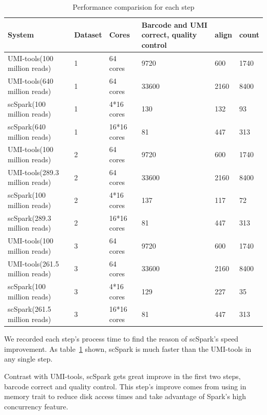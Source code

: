 \documentclass[conference]{IEEEtran}
\begin{document}
\begin{table}
	\centering
	\caption{Performance comparision for each step}\label{tab2}
	\resizebox{0.45\textwidth}{!} {
	\begin{tabular}{l | l | l | l | l | l}
		\hline
		System & Dataset & Cores & Barcode and UMI correct, quality control & align & count \\
		\hline
		UMI-tools(100 million reads) & 1 & 64 cores & 9720 & 600 & 1740 \\
		UMI-tools(640 million reads) & 1 & 64 cores & 33600 & 2160 & 8400 \\
		scSpark(100 million reads) & 1 & 4*16 cores & 130 & 132 & 93 \\
		scSpark(640 million reads) & 1 & 16*16 cores & 81 & 447 & 313 \\
		UMI-tools(100 million reads) & 2 & 64 cores & 9720 & 600 & 1740 \\
		UMI-tools(289.3 million reads) & 2 & 64 cores & 33600 & 2160 & 8400 \\
		scSpark(100 million reads) & 2 & 4*16 cores & 137 & 117 & 72 \\
		scSpark(289.3 million reads) & 2 & 16*16 cores & 81 & 447 & 313 \\
		UMI-tools(100 million reads) & 3 & 64 cores & 9720 & 600 & 1740 \\
		UMI-tools(261.5 million reads) & 3 & 64 cores & 33600 & 2160 & 8400 \\
		scSpark(100 million reads) & 3 & 4*16 cores & 129 & 227 & 35 \\
		scSpark(261.5 million reads) & 3 & 16*16 cores & 81 & 447 & 313 \\
		\hline
	\end{tabular} }
\end{table}

We recorded each step's process time to find the reason of scSpark's speed improvement.
As table~\ref{tab2} shown, scSpark is much faster than the UMI-tools in any single step.

Contrast with UMI-tools, scSpark gets great improve in the first two steps, barcode correct and quality control.
This step's improve comes from using in memory trait to reduce disk access times and take advantage of Spark's high concurrency feature.
\end{document}
